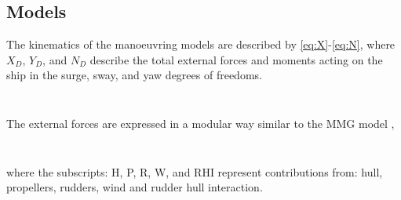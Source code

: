 \subsection{Models}
\label{sec:models}
The kinematics of the manoeuvring models are described by \autoref{eq:X}-\autoref{eq:N}, where $X_D$, $Y_D$, and $N_D$ describe the total external forces and moments acting on the ship in the surge, sway, and yaw degrees of freedoms.
\begin{equation}
    \label{eq:X}
    
\end{equation}

\begin{equation}
    \label{eq:Y}
    
\end{equation}

\begin{equation}
    \label{eq:N}
    
\end{equation}

The external forces are expressed in a modular way similar to the MMG model \citep{yasukawa_introduction_2015},

\begin{equation}
    \label{eq:X_D}
    
\end{equation}

\begin{equation}
    \label{eq:Y_D}
    
\end{equation}

\begin{equation}
    \label{eq:N_D}
    
\end{equation}
where the subscripts: H, P, R, W, and RHI represent contributions from: hull, propellers, rudders, wind and rudder hull interaction.
